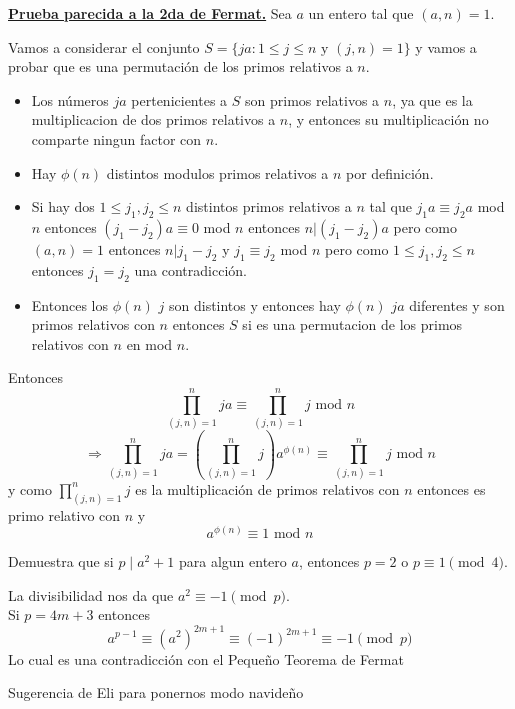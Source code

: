 \documentclass[11pt]{scrartcl}
\begin{document}
\underline{\textbf{Prueba parecida a la 2da de Fermat.}}
Sea $a$ un entero tal que $(a,n)=1$.

Vamos a considerar el conjunto $S=\{ja: 1\leq j \leq n \text{ y } (j,n)=1\}$ y vamos a probar que es una permutación de los primos relativos a $n$.
\begin{itemize}
\item Los números $ja$ pertenicientes a $S$ son primos relativos a $n$, ya que es la multiplicacion de dos primos relativos a $n$, y entonces su multiplicación no comparte ningun factor con $n$.
\item Hay $\phi (n)$ distintos modulos primos relativos a $n$ por definición.
\item Si hay dos $1\leq j_1,j_2 \leq n$ distintos primos relativos a $n$ tal que $j_1a\equiv j_2 a$ mod $n$ entonces $(j_1-j_2)a\equiv 0$ mod $n$ entonces $n|(j_1-j_2)a$ pero como $(a,n)=1$ entonces $n|j_1-j_2$ y $j_1\equiv j_2$ mod $n$ pero como $1\leq j_1,j_2 \leq n$ entonces $j_1=j_2$ una contradicción.
\item Entonces los $\phi (n)$ $j$ son distintos y entonces hay $\phi (n)$ $ja$ diferentes y son primos relativos con $n$ entonces $S$ si es una permutacion de los primos relativos con $n$ en mod $n$.
\end{itemize}
Entonces 
$$\prod_{(j,n)=1}^{n} ja \equiv \prod_{(j,n)=1}^{n} j \text{ mod } n $$
$$\Rightarrow \prod_{(j,n)=1}^{n} ja = (\prod_{(j,n)=1}^{n}j) a^{\phi (n)} \equiv \prod_{(j,n)=1}^{n} j \text{ mod } n$$
y como $\prod_{(j,n)=1}^{n} j$ es la multiplicación de primos relativos con $n$ entonces es primo relativo con $n$ y 
$$a^{\phi(n)}\equiv 1 \text{ mod } n$$



\begin{example}
    Demuestra que si $p \mid a^2+1$ para algun entero $a$, entonces $p=2$ o $p \equiv 1 \pmod 4$. 
\end{example}

\begin{soln}
La divisibilidad nos da que $a^2 \equiv -1 \pmod p$. \\
Si $p=4m+3$ entonces 
\[a^{p-1}\equiv  (a^2)^{2m+1}\equiv (-1)^{2m+1} \equiv -1 \pmod p\]
Lo cual es una contradicción con el Pequeño Teorema de Fermat
\end{soln}
\begin{remark*}
Sugerencia de Eli para ponernos modo navideño
\end{remark*}
\end{document}

